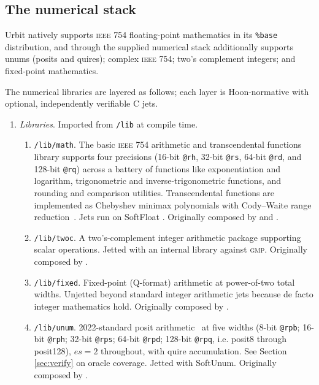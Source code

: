 \documentclass[twoside]{article}
\begin{document}
\subsection{The numerical stack}
\label{sec:stack}

Urbit natively supports \textsc{ieee} 754 floating-point mathematics in its \texttt{\%base} distribution, and through the supplied numerical stack additionally supports unums (posits and quires); complex \textsc{ieee} 754; two's complement integers; and fixed-point mathematics.

The numerical libraries are layered as follows; each layer
is Hoon-normative with optional, independently verifiable C jets.

\begin{enumerate}
  \item  \emph{Libraries}.  Imported from \texttt{/lib} at compile time.
  \begin{enumerate}
    \item  \sloppy\texttt{/lib/math}.  The basic \textsc{ieee} 754 arithmetic and transcendental functions library supports four precisions (16-bit \texttt{@rh}, 32-bit \texttt{@rs}, 64-bit \texttt{@rd}, and 128-bit \texttt{@rq}) across a battery of functions like exponentiation and logarithm, trigonometric and inverse-trigonometric functions, and rounding and comparison utilities.  Transcendental functions are implemented as Chebyshev minimax polynomials with Cody--Waite range reduction~\citep{codywaite1980}.  Jets run on SoftFloat \citep{hauser_softfloat}.  Originally composed by  and .
    \item \texttt{/lib/twoc}.  A two's-complement integer arithmetic package supporting scalar operations.  Jetted with an internal library against \textsc{gmp}.  Originally composed by .  
    \item \texttt{/lib/fixed}.  Fixed-point (Q-format) arithmetic at power-of-two total widths.  Unjetted beyond standard integer arithmetic jets because de facto integer mathematics hold.  Originally composed by .
    \item \texttt{/lib/unum}.  2022-standard posit arithmetic~\citep{positstd2022} at five widths (8-bit \texttt{@rpb}; 16-bit \texttt{@rph}; 32-bit \texttt{@rps}; 64-bit \texttt{@rpd}; 128-bit \texttt{@rpq}, i.e. posit8 through posit128), $es=\text{2}$ throughout, with quire accumulation.  See Section \ref{sec:verify} on oracle coverage.  Jetted with SoftUnum.  Originally composed by .

\end{enumerate}
\end{enumerate}
\end{document}
